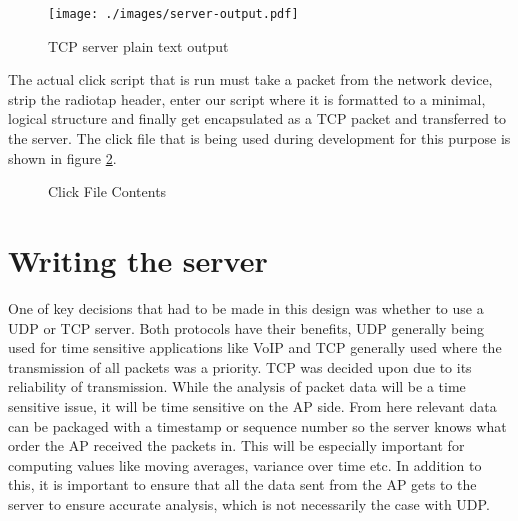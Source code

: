 \begin{figure}[h!]
 \centering
 \texttt{[image: ./images/server-output.pdf]}
 \caption{TCP server plain text output}
 \label{fig:server-output}
\end{figure}

The actual click script that is run must take a packet from the network device, strip the radiotap header, enter our script where it is formatted to a minimal, logical structure and finally get encapsulated as a TCP packet and transferred to the server. The click file that is being used during development for this purpose is shown in figure \ref{fig:click-dev}.

\begin{figure}[h!]
  
  \caption{Click File Contents}    
  \label{fig:click-dev}  
\end{figure}

\section{Writing the server}

One of key decisions that had to be made in this design was whether to use a UDP or TCP server. Both protocols have their benefits, UDP generally being used for time sensitive applications like VoIP and TCP generally used where the transmission of all packets was a priority. TCP was decided upon due to its reliability of transmission. While the analysis of packet data will be a time sensitive issue, it will be time sensitive on the AP side. From here relevant data can be packaged with a timestamp or sequence number so the server knows what order the AP received the packets in. This will be especially important for computing values like moving averages, variance over time etc. In addition to this, it is important to ensure that all the data sent from the AP gets to the server to ensure accurate analysis, which is not necessarily the case with UDP.

